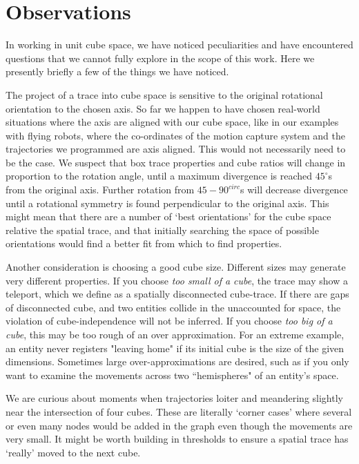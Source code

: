 \section{Observations}
\label{sec:observations}

In working in unit cube space, we have noticed peculiarities and have encountered questions that we cannot fully explore in the scope of this work.  
Here we presently briefly a few of the things we have noticed.

The project of a trace into cube space is sensitive to the original rotational orientation to the chosen axis.
So far we happen to have chosen real-world situations where the axis are aligned with our cube space, like in our examples with flying robots, where the co-ordinates of the motion capture system and the trajectories we programmed are axis aligned.
This would not necessarily need to be the case.
We suspect that box trace properties and cube ratios will change in proportion to the rotation angle, until a maximum divergence is reached $45^{\circ}$s from the original axis.
Further rotation from $45-90^{circ}$s will decrease divergence until a rotational symmetry is found perpendicular to the original axis.
This might mean that there are a number of `best orientations' for the cube space relative the spatial trace, and that initially searching the space of possible orientations would find a better fit from which to find properties.

Another consideration is choosing a good cube size.  
Different sizes may generate very different properties.
 If you choose \emph{too small of a cube}, the trace may show a teleport, which we define as a spatially disconnected cube-trace.
If there are gaps of disconnected cube, and two entities collide in the unaccounted for space, the violation of cube-independence will not be inferred.
 If you choose \emph{too big of a cube}, this may be too rough of an over approximation.
For an extreme example, an entity never registers "leaving home" if its initial cube is the size of the given dimensions.
Sometimes large over-approximations are desired, such as if you only want to examine the movements across two ``hemispheres" of an entity's space.

We are curious about moments when trajectories loiter and meandering slightly near the intersection of four cubes.
These are literally `corner cases' where several or even many nodes would be added in the graph even though the movements are very small.
It might be worth building in thresholds to ensure a spatial trace has `really' moved to the next cube.




